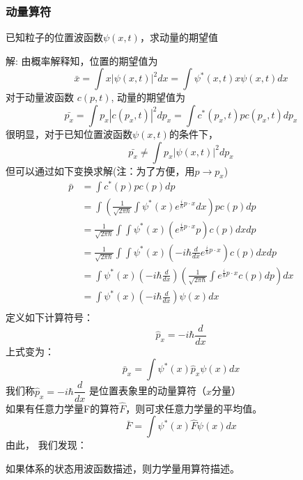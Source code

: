 \begin{frame} [allowframebreaks=]
    \frametitle{动量算符}
    \begin{exampleblock}{}
        已知粒子的位置波函数$\psi(x,t)$，求动量的期望值   
    \end{exampleblock}
    \alert{解:} 由概率解释知，位置的期望值为
    \begin{equation*}
        \bar{x}=\int x|\psi(x, t)|^{2} d x=\int \psi^{*}(x, t) x \psi(x, t) d x
    \end{equation*}
    对于动量波函数 $c(p,t)$, 动量的期望值为
    \begin{equation*}
        \bar{p_x}=\int p_x|c(p_x, t)|^{2} d p_x=\int c^{*}(p_x, t) p c(p_x, t) d p_x
    \end{equation*}
    很明显，对于已知位置波函数$\psi(x,t)$的条件下，
    \begin{equation*}
        \bar{p_x}\neq\int p_x|\psi(x, t)|^{2} d p_x
    \end{equation*}
    但可以通过如下变换求解(注：为了方便，用$p \to p_x$)
    \begin{equation*}
        \begin{split}
            \bar{p}&=\int c^{*}(p) p c(p) d p \\  
            &=\int (\frac{1}{\sqrt{2 \pi \hbar}} \int \psi^{*}(x) e^{\frac{i}{\hbar} p\cdot x} d x) p c\left(p\right) d p \\
            &=\frac{1}{\sqrt{2 \pi \hbar}} \int \int \psi^{*}(x) (e^{\frac{i}{\hbar} p\cdot x}  p) c\left(p\right) d xd p \\
            &=\frac{1}{\sqrt{2 \pi \hbar}} \int \int \psi^{*}(x) (-i\hbar\frac{d}{d x} e^{\frac{i}{\hbar} p\cdot x}) c(p) d xd p \\
            &=\int \psi^{*}(x) (-i\hbar\frac{d}{d x}) (\frac{1}{\sqrt{2 \pi \hbar}} \int e^{\frac{i}{\hbar} p\cdot x} c(p) d p)  d x\\
            &=\int \psi^{*}(x) (-i\hbar\frac{d}{d x}) \psi(x)  d x\\
         \end{split}
    \end{equation*}  
    定义如下计算符号：
    $$ \hat{p}_x= -i\hbar\frac{d}{d x} $$ 
    上式变为：         
    $$\bar{p}_x=\int \psi^{*}(x) \hat{p}_x \psi(x) d x $$
    我们称$ \hat{p}_x= -i\hbar\dfrac{d}{d x} $ 是位置表象里的动量算符（$x$分量）\\
    如果有任意力学量F的算符$\hat{F}$，则可求任意力学量的平均值。\\
    $$\bar{F}=\int \psi^{*}(x) \hat{F} \psi(x) d x $$
    由此， 我们发现：
    \begin{tcolorbox}[colback=yellow!10,colframe=red!75!black,title=Basic assumption 3/5]
    如果体系的状态用波函数描述，则力学量用算符描述。
    \end{tcolorbox}
\end{frame} 

